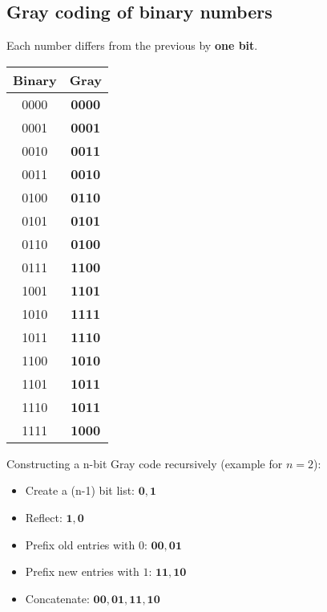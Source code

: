 \documentclass{article}
\begin{document}
    \subsection{Gray coding of binary numbers}
    Each number differs from the previous by \textbf{one bit}. \\

    \begin{multicols*}{2}
        \begin{tabular}{|c|c|}  %
            \hline  %
            Binary & Gray \\
            \hline  %
            0000 & \textbf{0000} \\
            0001 & \textbf{0001} \\
            0010 & \textbf{0011} \\
            0011 & \textbf{0010} \\
            0100 & \textbf{0110} \\
            0101 & \textbf{0101} \\
            0110 & \textbf{0100} \\
            0111 & \textbf{1100} \\
            1001 & \textbf{1101} \\
            1010 & \textbf{1111} \\
            1011 & \textbf{1110} \\
            1100 & \textbf{1010} \\
            1101 & \textbf{1011} \\
            1110 & \textbf{1011} \\
            1111 & \textbf{1000} \\
            \hline  %
        \end{tabular} 

        \columnbreak 
        
        Constructing a n-bit Gray code recursively (example for $n = 2$):
        \begin{itemize}
            \item Create a (n-1) bit list: $\mathbf{0, 1}$
            \item Reflect: $\mathbf{1, 0}$
            \item Prefix old entries with $0$: $\mathbf{00, 01}$
            \item Prefix new entries with $1$: $\mathbf{11, 10}$
            \item Concatenate: $\mathbf{00, 01, 11, 10}$ 
        \end{itemize}    
    \end{multicols*}
\end{document}
